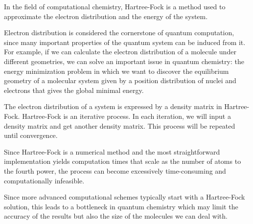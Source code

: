 \documentclass[twoside]{article}
\begin{document}
In the field of computational chemistry, Hartree-Fock is a method used to approximate the electron distribution and the energy of the system. 


Electron distribution is considered the cornerstone of quantum computation, since many important properties of the quantum system can be induced from it. For example, if we can calculate the electron distribution of a molecule under different geometries, we can solve an important issue in quantum chemistry: the energy minimization problem in which we want to discover the equilibrium geometry of a molecular system given by a position distribution of nuclei and electrons that gives the global minimal energy. 

 
 
The electron distribution of a system is expressed by a density matrix in Hartree-Fock. Hartree-Fock is an iterative process. In each iteration, we will input a density matrix and get another density matrix. This process will be repeated until convergence.

Since Hartree-Fock is a numerical method and the most straightforward implementation yields computation times that scale as the number of atoms to the fourth power, the process can become excessively time-consuming and computationally infeasible.


Since more advanced computational schemes typically start with a Hartree-Fock solution, this leads to a bottleneck in quantum chemistry which may limit the accuracy of the results but also the size of the molecules we can deal with.






\end{document}
